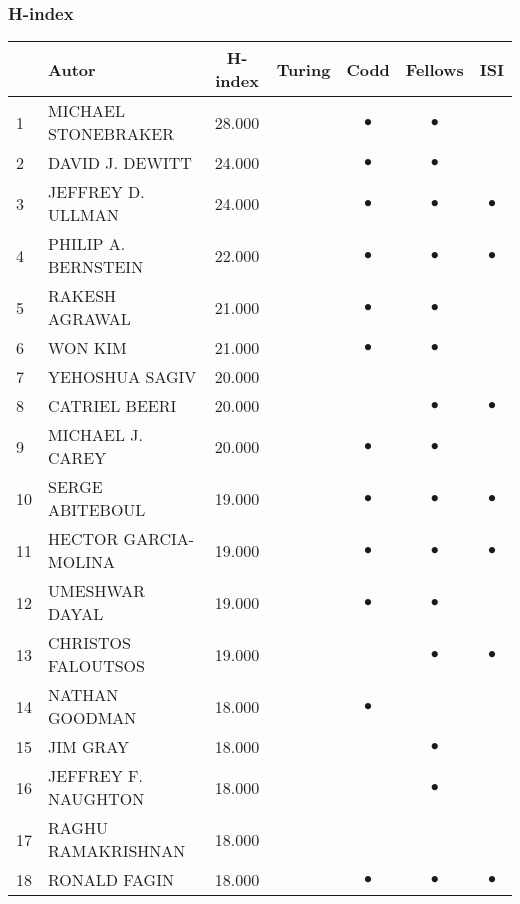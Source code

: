 \documentclass[12pt,titlepage]{report}
\begin{document}
\subsubsection{H-index}
\begin{center}
\begin{tabular}{|l|l|c|c|c|c|c|}
\hline
& {\bf Autor} & {\bf H-index} & {\bf Turing} & {\bf Codd} & {\bf Fellows} & {\bf ISI} \\
\hline
1 & MICHAEL STONEBRAKER & 28.000  & & $\bullet$ & $\bullet$ &         \\
\hline
2 & DAVID J. DEWITT & 24.000      & & $\bullet$ & $\bullet$ &         \\
\hline
3 & JEFFREY D. ULLMAN & 24.000    & & $\bullet$ & $\bullet$ & $\bullet$ \\
\hline
4 & PHILIP A. BERNSTEIN & 22.000  & & $\bullet$ & $\bullet$ & $\bullet$ \\
\hline
5 & RAKESH AGRAWAL & 21.000       & & $\bullet$ & $\bullet$ &         \\
\hline
6 & WON KIM & 21.000              & & $\bullet$ & $\bullet$ &         \\
\hline
7 & YEHOSHUA SAGIV & 20.000       & &         &         &         \\
\hline
8 & CATRIEL BEERI & 20.000        & &         & $\bullet$ & $\bullet$ \\
\hline
9 & MICHAEL J. CAREY & 20.000     & & $\bullet$ & $\bullet$ &         \\
\hline
10 & SERGE ABITEBOUL & 19.000      & & $\bullet$ & $\bullet$ & $\bullet$ \\
\hline
11 & HECTOR GARCIA-MOLINA & 19.000 & & $\bullet$ & $\bullet$ & $\bullet$ \\
\hline
12 & UMESHWAR DAYAL & 19.000       & & $\bullet$ & $\bullet$ &         \\
\hline
13 & CHRISTOS FALOUTSOS & 19.000   & &         & $\bullet$ & $\bullet$ \\
\hline
14 & NATHAN GOODMAN & 18.000       & & $\bullet$ &         &         \\
\hline
15 & JIM GRAY & 18.000             & &         & $\bullet$ &         \\
\hline
16 & JEFFREY F. NAUGHTON & 18.000  & &         & $\bullet$ &         \\
\hline
17 & RAGHU RAMAKRISHNAN & 18.000   & &         &         &         \\
\hline
18 & RONALD FAGIN & 18.000         & & $\bullet$ & $\bullet$ & $\bullet$ \\

\end{tabular}
\end{center}
\end{document}
